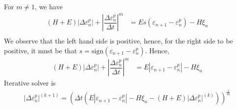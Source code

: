 \documentclass[11pt]{article}
\begin{document}
For $m\neq 1$, we have 
\begin{align}
(H+E) |\Delta \varepsilon^p_n| + \left|\dfrac{\Delta \varepsilon_n^p}{\Delta t} \right|^m &=  Es(\varepsilon_{n+1}-\varepsilon^p_n ) - H \xi_n \\
\end{align}
We observe that the left hand side is positive, hence, for the right side to be positive, it must be that $s = \mathrm{sign}(\varepsilon_{n+1}-\varepsilon^p_n)$.
Hence, 
\begin{align}
(H+E) |\Delta \varepsilon^p_n| + \left|\dfrac{\Delta \varepsilon_n^p}{\Delta t} \right|^m &=  E|\varepsilon_{n+1}-\varepsilon^p_n |- H \xi_n 
\end{align}
Iterative solver is 
\begin{align}
|\Delta \varepsilon^p_n|^{(k+1)} = \left( \Delta t \left( E|\varepsilon_{n+1}-\varepsilon^p_n |- H \xi_n - (H+E) |\Delta \varepsilon^p_n|^{(k)} \right) \right)^{\frac{1}{m}}
\end{align}
\end{document}
